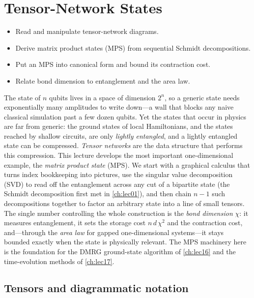 \chapter{Tensor-Network States}
\label{ch:lec15}

\begin{objectives}
\begin{itemize}[leftmargin=1.4em,nosep]
  \item Read and manipulate tensor-network diagrams.
  \item Derive matrix product states (MPS) from sequential Schmidt decompositions.
  \item Put an MPS into canonical form and bound its contraction cost.
  \item Relate bond dimension to entanglement and the area law.
\end{itemize}
\end{objectives}

The state of $n$ qubits lives in a space of dimension $2^{n}$, so a generic state
needs exponentially many amplitudes to write down---a wall that blocks any naive
classical simulation past a few dozen qubits. Yet the states that occur in
physics are far from generic: the ground states of local Hamiltonians, and the
states reached by shallow circuits, are only \emph{lightly entangled}, and a
lightly entangled state can be compressed. \emph{Tensor networks} are the data
structure that performs this compression. This lecture develops the most
important one-dimensional example, the \emph{matrix product state} (MPS). We
start with a graphical calculus that turns index bookkeeping into pictures, use
the singular value decomposition (SVD) to read off the entanglement across any
cut of a bipartite state (the Schmidt decomposition first met in
\cref{ch:lec01}), and then chain $n-1$ such decompositions together to factor an
arbitrary state into a line of small tensors. The single number controlling the
whole construction is the \emph{bond dimension} $\chi$: it measures entanglement,
it sets the storage cost $n\,d\,\chi^{2}$ and the contraction cost, and---through
the \emph{area law} for gapped one-dimensional systems---it stays bounded exactly
when the state is physically relevant. The MPS machinery here is the foundation
for the DMRG ground-state algorithm of \cref{ch:lec16} and the time-evolution
methods of \cref{ch:lec17}.

\section{Tensors and diagrammatic notation}
\label{sec:lec15-1}

